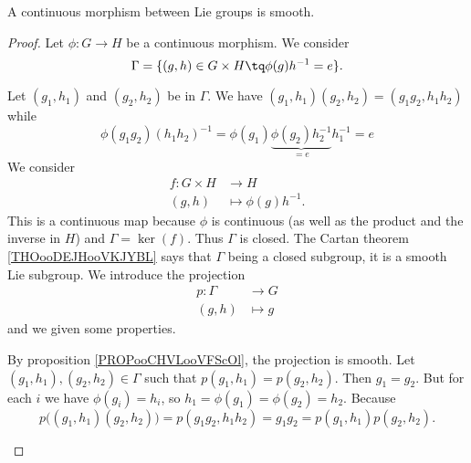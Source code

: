 \begin{theorem}
\begin{proposition}
	A continuous morphism between Lie groups is smooth.
\end{proposition}

\begin{proof}
	Let \( \phi\colon G\to H\) be a continuous morphism. We consider
	\begin{equation}
		\Gamma=\{ (g,h)\in G\times H\tq \phi(g)h^{-1}=e \}.
	\end{equation}
	\begin{subproof}
		Let \( (g_1,h_1)\) and \( (g_2,h_2)\) be in \( \Gamma\). We have \( (g_1,h_1)(g_2,h_2)=(g_1g_2,h_1h_2)\) while
		\begin{equation}
			\phi(g_1g_2)(h_1h_2)^{-1}=\phi(g_1)\underbrace{\phi(g_2)h_2^{-1}}_{=e}h_1^{-1}=e
		\end{equation}
		We consider
		\begin{equation}
			\begin{aligned}
				f\colon G\times H & \to H                  \\
				(g,h)             & \mapsto \phi(g)h^{-1}.
			\end{aligned}
		\end{equation}
		This is a continuous map because \( \phi\) is continuous (as well as the product and the inverse in \( H\)) and \( \Gamma=\ker(f)\). Thus \( \Gamma\) is closed.
		The Cartan theorem \ref{THOooDEJHooVKJYBL} says that \( \Gamma\) being a closed subgroup, it is a smooth Lie subgroup.
		We introduce the projection
		\begin{equation}
			\begin{aligned}
				p\colon \Gamma & \to G     \\
				(g,h)          & \mapsto g
			\end{aligned}
		\end{equation}
		and we given some properties.
		\begin{subproof}
			\spitem[Smooth]
			By proposition \ref{PROPooCHVLooVFScOl}, the projection is smooth.
			\spitem[Bijective]
			Let \( (g_1,h_1),(g_2,h_2)\in \Gamma\) such that \( p(g_1,h_1)=p(g_2,h_2)\). Then \( g_1=g_2\). But for each \( i\) we have \( \phi(g_i)=h_i\), so \( h_1=\phi(g_1)=\phi(g_2)=h_2\).
			\spitem[Morphism]
			Because
			\begin{equation}
				p\big( (g_1,h_1)(g_2,h_2) \big)=p(g_1g_2,h_1h_2)=g_1g_2=p(g_1,h_1)p(g_2,h_2).

\end{equation}
\end{subproof}
\end{subproof}
\end{proof}
\end{theorem}
